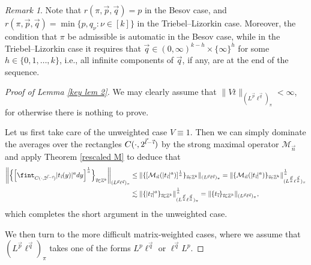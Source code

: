 \documentclass[11pt, reqno]{amsart}
\theoremstyle{definition}
\theoremstyle{remark}
\newtheorem{remark}[theorem]{Remark}
\numberwithin{equation}{section}
\newcommand{\Z}{\mathbb Z}
\newcommand{\vi}{\vec{\textit{\i}}}
\newcommand{\vn}{\vec n}
\newcommand{\vl}{\vec l}
\newcommand{\vp}{\vec p}
\newcommand{\vq}{\vec q}
\newcommand{\abs}[1]{|#1|}
\newcommand{\Norm}[2]{\|#1\|_{#2}}
\begin{document}
\begin{remark}
Note that $r(\pi,\vp,\vq)=p$ in the Besov case, and $r(\pi,\vp,\vq)=\min\{p,q_\nu:\nu\in[k]\}$ in the Triebel--Lizorkin case. Moreover, the condition that $\pi$ be admissible is automatic in the Besov case, while in the Triebel--Lizorkin case it requires that $\vq\in(0,\infty)^{k-h}\times\{\infty\}^{h}$ for some $h\in\{0,1,\ldots,k\}$, i.e., all infinite components of $\vq$, if any, are at the end of the sequence.
\end{remark}

\begin{proof}[Proof of Lemma \ref{key lem 2}]
We may clearly assume that $\Norm{Vt}{(L^{\vp}\ell^{\vq})_\pi}<\infty$, for otherwise there is nothing to prove.

Let us first take care of the unweighted case $V\equiv 1$. Then we can simply dominate the averages over the rectangles $C(\cdot,2^{\vl-\vi})$ by the strong maximal operator $\mathcal M_{\vn}$ and apply Theorem \ref{rescaled M} to deduce that
\begin{align*}
\bigg\|\Big\{\Big[\fint_{C(\cdot,2^{\vl-\vi})}\abs{t_{\vi}(y)}^a dy\Big]^{\frac1a}\Big\}_{\vi\in\Z^k}
\bigg\|_{(L^{\vp}\ell^{\vq})_\pi}
&\leq\Norm{\{[\mathcal M_{\vn}(\abs{t_{\vi}}^a)]^{\frac1a}\}_{\vi\in\Z^k}}{(L^{\vp}\ell^{\vq})_\pi}
=\Norm{\{\mathcal M_{\vn}(\abs{t_{\vi}}^a)\}_{\vi\in\Z^k}}{(L^{\frac{\vp}{a}}\ell^{\frac{\vq}{a}})_\pi} ^{\frac1a} \\
&\lesssim\Norm{\{\abs{t_{\vi}}^a\}_{\vi\in\Z^k}}{(L^{\frac{\vp}{a}}\ell^{\frac{\vq}{a}})_\pi} ^{\frac1a}
=\Norm{\{t_{\vi}\}_{\vi\in\Z^k}}{(L^{\vp}\ell^{\vq})_\pi},
\end{align*}
which completes the short argument in the unweighted case.

We then turn to the more difficult matrix-weighted cases, where we assume that $(L^{\vp}\ell^{\vq})_\pi$ takes one of the forms $L^p\ell^{\vq}$ or $\ell^{\vq}L^p$.


\end{proof}
\end{document}
